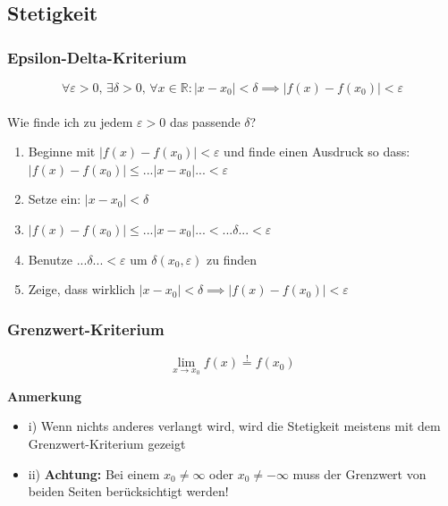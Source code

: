 \documentclass[8pt, a4paper, landscape, fleqn]{scrartcl}
\newenvironment {annotation}[1]
				{\begin{itshape} \begin{small} \textbf{#1} \begin{itemize}}
				{\end{itemize} \end{small} \end{itshape}}
\begin{document}
\begin{multicols*}{3}
			\subsection{Stetigkeit}
				\subsubsection{Epsilon-Delta-Kriterium}
				\begin{equation*}
					\forall \varepsilon > 0, \hspace{2pt} \exists \delta > 0, \hspace{2pt} \forall x \in \mathbb{R}: \vert x-x_0 \vert < \delta \implies \left \vert f(x)-f(x_0) \right \vert < \varepsilon
				\end{equation*}
				\\
				Wie finde ich zu jedem $\varepsilon > 0$ das passende  $\delta$?
				\begin{enumerate}
						\item Beginne mit $\left \vert f(x)-f(x_0) \right \vert < \varepsilon$ und finde einen Ausdruck so dass:
				        $\left \vert f(x)-f(x_0) \right \vert \le ...\vert x-x_0 \vert ... < \varepsilon$
						\item Setze ein: $\vert x-x_0 \vert < \delta$
						\item $\left \vert f(x)-f(x_0) \right \vert \le ...\vert x-x_0 \vert ... <  ...\delta... <\varepsilon$
						\item Benutze $...\delta... <\varepsilon$ um $\delta(x_0, \varepsilon)$ zu finden
						\item Zeige, dass wirklich $\vert x-x_0 \vert < \delta \implies \left \vert f(x)-f(x_0) \right \vert < \varepsilon$
					\end{enumerate}
				
				\subsubsection{Grenzwert-Kriterium}
					\begin{equation*}
						\lim_{x \rightarrow x_0} f(x) \overset{!}{=} f(x_0) 
					\end{equation*}
					\begin{annotation}{Anmerkung}
						\item[i)] Wenn nichts anderes verlangt wird, wird die Stetigkeit meistens mit dem Grenzwert-Kriterium gezeigt
						\item[ii)] \textbf{Achtung:} Bei einem $x_0 \neq \infty$ oder $x_0 \neq-\infty$ muss der Grenzwert von beiden Seiten berücksichtigt werden!
					\end{annotation}

\end{multicols*}
\end{document}
